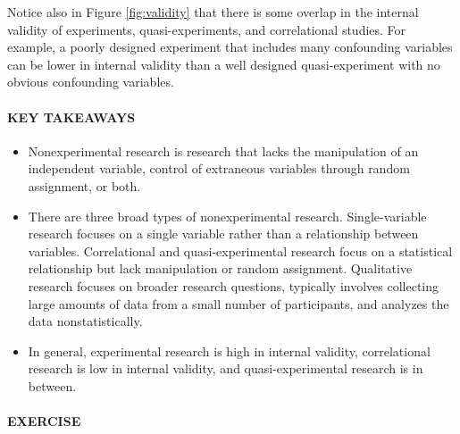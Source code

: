\documentclass[
]{krantz}
\providecommand{\tightlist}{%
  \setlength{\itemsep}{0pt}\setlength{\parskip}{0pt}}
\begin{document}
Notice also in Figure \ref{fig:validity} that there is some overlap in the internal validity of experiments, quasi-experiments, and correlational studies. For example, a poorly designed experiment that includes many confounding variables can be lower in internal validity than a well designed quasi-experiment with no obvious confounding variables.

\hypertarget{key-takeaways-22}{%
\paragraph*{KEY TAKEAWAYS}\label{key-takeaways-22}}

\begin{itemize}
\tightlist
\item
  Nonexperimental research is research that lacks the manipulation of an independent variable, control of extraneous variables through random assignment, or both.
\item
  There are three broad types of nonexperimental research. Single-variable research focuses on a single variable rather than a relationship between variables. Correlational and quasi-experimental research focus on a statistical relationship but lack manipulation or random assignment. Qualitative research focuses on broader research questions, typically involves collecting large amounts of data from a small number of participants, and analyzes the data nonstatistically.
\item
  In general, experimental research is high in internal validity, correlational research is low in internal validity, and quasi-experimental research is in between.
\end{itemize}

\hypertarget{exercise-3}{%
\paragraph*{EXERCISE}\label{exercise-3}}
\end{document}
